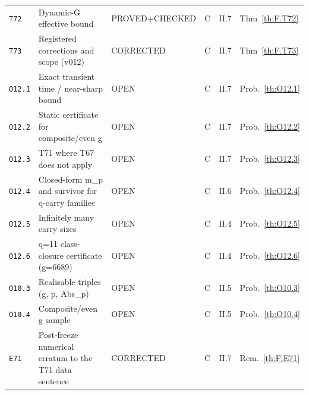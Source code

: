 \begin{longtable}{@{}p{13mm}p{45mm}p{33mm}p{8mm}p{12mm}p{17mm}@{}}
\texttt{T72} & Dynamic-G effective bound & PROVED+CHECKED & C & II.7 & Thm~\ref{th:F.T72} \\
\texttt{T73} & Registered corrections and scope (v012) & CORRECTED & C & II.7 & Thm~\ref{th:F.T73} \\
\texttt{O12.1} & Exact transient time / near-sharp bound & OPEN & C & II.7 & Prob.~\ref{th:O12.1} \\
\texttt{O12.2} & Static certificate for composite/even g & OPEN & C & II.7 & Prob.~\ref{th:O12.2} \\
\texttt{O12.3} & T71 where T67 does not apply & OPEN & C & II.7 & Prob.~\ref{th:O12.3} \\
\texttt{O12.4} & Closed-form m\_p and survivor for q-carry families & OPEN & C & II.6 & Prob.~\ref{th:O12.4} \\
\texttt{O12.5} & Infinitely many carry sizes & OPEN & C & II.4 & Prob.~\ref{th:O12.5} \\
\texttt{O12.6} & q=11 class-closure certificate (g=6689) & OPEN & C & II.4 & Prob.~\ref{th:O12.6} \\
\texttt{O10.3} & Realisable triples (g, p, Abs\_p) & OPEN & C & II.5 & Prob.~\ref{th:O10.3} \\
\texttt{O10.4} & Composite/even g sample & OPEN & C & II.5 & Prob.~\ref{th:O10.4} \\
\texttt{E71} & Post-freeze numerical erratum to the T71 data sentence & CORRECTED & C & II.7 & Rem.~\ref{th:F.E71} \\
\bottomrule
\end{longtable}
\normalsize
